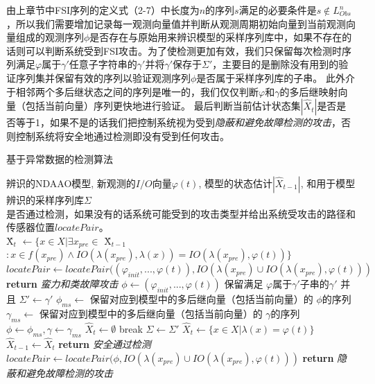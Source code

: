 由上章节中FSI序列的定义式（2-7）中长度为$n$的序列$s$满足的必要条件是$s\notin L_{Obs}^n$，所以我们需要增加记录每一观测向量值并判断从观测周期初始向量到当前观测向量组成的观测序列$\phi$是否存在与原始用来辨识模型的采样序列库中，如果不存在的话则可以判断系统受到FSI攻击。为了使检测更加有效，我们只保留每次检测时序列满足$ \varphi$属于$\gamma'$任意子字符串的$\gamma'$并将$\gamma'$保存于$\varSigma'$，主要目的是删除没有用到的验证序列集并保留有效的序列以验证观测序列$\phi$是否属于采样序列库的子串。 此外介于相邻两个多后继状态之间的序列是唯一的，我们仅仅判断$ \varphi $和$ \gamma $的多后继映射向量（包括当前向量）序列更快地进行验证。 最后判断当前估计状态集$|\hat{X}_{t}|$是否是否等于1，如果不是的话我们把控制系统视为受到\textit {隐蔽和避免故障检测的攻击}，否则控制系统将安全地通过检测即没有受到任何攻击。

\begin{algorithm}[h]
		\caption{基于异常数据的检测算法}
		\label{algo:abd}
		\begin{algorithmic}[1]
			\Require %
			辨识的NDAAO模型, 新观测的$I/O$向量$\varphi(t)$, 模型的状态估计$|\hat{X}_{t-1}|$, 和用于模型辨识的采样序列库$\varSigma$ \\  
			\Ensure %
			是否通过检测，如果没有的话系统可能受到的攻击类型并给出系统受攻击的路径和传感器位置$locatePair$。 \\
			\State \^{X}$_{t}$ $\leftarrow \{x\in X|\exists x_{pre}\in$ \^{X}$_{t-1}$$:x\in f(x_{pre}) \wedge IO(\lambda(x_{pre}),\lambda(x))=IO(\lambda(x_{pre}),\varphi(t))\}$
			\State $locatePair\leftarrow locatePair((\varphi_{init},...,\varphi(t)),IO(\lambda(x_{pre})\cup IO(\lambda(x_{pre}),\varphi(t)))$
			\State \textbf{return} \textit{蛮力和类故障攻击}
			\EndIf
			\State $\phi \leftarrow (\varphi_{init},...,\varphi(t))$
			\State 保留满足 $\varphi 属于\gamma'$子串的$\gamma'$ 并且 $\varSigma' \leftarrow \gamma'$
			\State $\phi_{ms} \leftarrow$ 保留对应到模型中的多后继向量（包括当前向量）的 $\phi$的序列
			\State $\gamma_{ms} \leftarrow$ 保留对应到模型中的多后继向量（包括当前向量）的 $\gamma$的序列
			\State $\phi\leftarrow \phi_{ms}, \gamma\leftarrow \gamma_{ms}$
			\State $\hat{X}_t \leftarrow \emptyset$
			\State break
			\EndIf
			\EndFor
			$\varSigma \leftarrow \varSigma'$
			\EndIf
			\Else
			\State $\hat{X}_t \leftarrow \{x\in X|\lambda(x)=\varphi(t)\}$
			\EndIf
			$\hat{X}_{t-1}\leftarrow \hat{X}_t$
			\State \textbf{return} \textit{安全通过检测}
			\Else
			\State $locatePair\leftarrow locatePair(\phi,IO(\lambda(x_{pre})\cup
			IO(\lambda(x_{pre}),\varphi(t)))$
			\State \textbf{return} \textit{隐蔽和避免故障检测的攻击}
			\EndIf
		\end{algorithmic}
	\end{algorithm}

